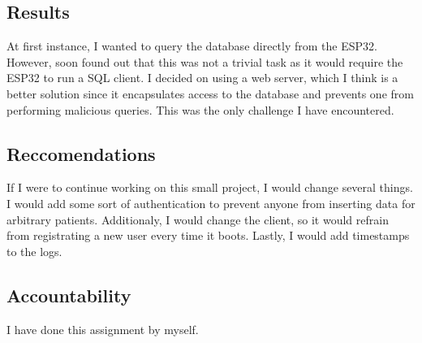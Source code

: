 
\subsection{Results}

At first instance, I wanted to query the database directly from the ESP32.
However, soon found out that this was not a trivial task as it would require the ESP32 to run a SQL client.
I decided on using a web server, which I think is a better solution since it encapsulates access to the database and prevents one from performing malicious queries.
This was the only challenge I have encountered.

\subsection{Reccomendations}

If I were to continue working on this small project, I would change several things. 
I would add some sort of authentication to prevent anyone from inserting data for arbitrary patients.
Additionaly, I would change the client, so it would refrain from registrating a new user every time it boots.
Lastly, I would add timestamps to the logs.

\subsection{Accountability}

I have done this assignment by myself.

\clearpage

